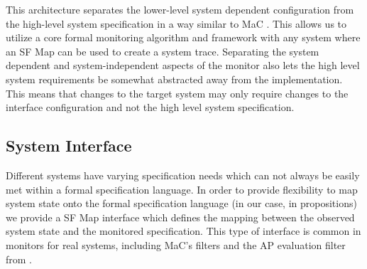This architecture separates the lower-level system dependent configuration from the high-level system specification in a way similar to MaC \cite{Kim2004}.
This allows us to utilize a core formal monitoring algorithm and framework with any system where an \textsf{SF Map} can be used to create a system trace.
Separating the system dependent and system-independent aspects of the monitor also lets the high level system requirements be somewhat abstracted away from the implementation. This means that changes to the target system may only require changes to the interface configuration and not the high level system specification. 

\subsection{System Interface}
Different systems have varying specification needs which can not always be easily met within a formal specification language. 
In order to provide flexibility to map system state onto the formal specification language (in our case, in propositions) we provide a \textsf{SF Map} interface which defines the mapping between the observed system state and the monitored specification. 
This type of interface is common in monitors for real systems, including MaC's filters \cite{Kim2004} and the AP evaluation filter from \cite{Heffernan2014}.
